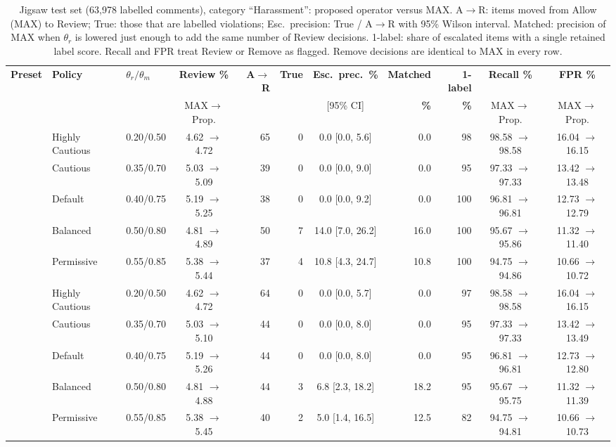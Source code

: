 \begin{table}[!t]
\caption{Jigsaw test set (63,978 labelled comments), category ``Harassment'': proposed operator versus MAX.
A$\to$R: items moved from Allow (MAX) to Review; True: those that are labelled violations;
Esc.\ precision: True / A$\to$R with 95\% Wilson interval. Matched: precision of MAX when $\theta_r$ is lowered
just enough to add the same number of Review decisions. 1-label: share of escalated items with a single retained
label score. Recall and FPR treat Review or Remove as flagged.
Remove decisions are identical to MAX in every row.}
\label{tab:jigsaw-harassment}
\centering\scriptsize
\setlength{\tabcolsep}{3pt}
\begin{tabular}{@{}lllcrrcrrcc@{}}
\toprule
\textbf{Preset} & \textbf{Policy} & $\theta_r/\theta_m$ & \textbf{Review \%} & \textbf{A$\to$R} & \textbf{True} &
\textbf{Esc.\ prec.\ \%} & \textbf{Matched} & \textbf{1-label} & \textbf{Recall \%} & \textbf{FPR \%} \\
 & & & MAX$\to$Prop. & & & [95\% CI] & \textbf{\%} & \textbf{\%} & MAX$\to$Prop. & MAX$\to$Prop. \\
\midrule
{} & Highly Cautious & 0.20/0.50 & 4.62 $\to$ 4.72 & 65 & 0 & 0.0 [0.0, 5.6] & 0.0 & 98 & 98.58 $\to$ 98.58 & 16.04 $\to$ 16.15 \\
 & Cautious & 0.35/0.70 & 5.03 $\to$ 5.09 & 39 & 0 & 0.0 [0.0, 9.0] & 0.0 & 95 & 97.33 $\to$ 97.33 & 13.42 $\to$ 13.48 \\
 & Default & 0.40/0.75 & 5.19 $\to$ 5.25 & 38 & 0 & 0.0 [0.0, 9.2] & 0.0 & 100 & 96.81 $\to$ 96.81 & 12.73 $\to$ 12.79 \\
 & Balanced & 0.50/0.80 & 4.81 $\to$ 4.89 & 50 & 7 & 14.0 [7.0, 26.2] & 16.0 & 100 & 95.67 $\to$ 95.86 & 11.32 $\to$ 11.40 \\
 & Permissive & 0.55/0.85 & 5.38 $\to$ 5.44 & 37 & 4 & 10.8 [4.3, 24.7] & 10.8 & 100 & 94.75 $\to$ 94.86 & 10.66 $\to$ 10.72 \\
\midrule
{} & Highly Cautious & 0.20/0.50 & 4.62 $\to$ 4.72 & 64 & 0 & 0.0 [0.0, 5.7] & 0.0 & 97 & 98.58 $\to$ 98.58 & 16.04 $\to$ 16.15 \\
 & Cautious & 0.35/0.70 & 5.03 $\to$ 5.10 & 44 & 0 & 0.0 [0.0, 8.0] & 0.0 & 95 & 97.33 $\to$ 97.33 & 13.42 $\to$ 13.49 \\
 & Default & 0.40/0.75 & 5.19 $\to$ 5.26 & 44 & 0 & 0.0 [0.0, 8.0] & 0.0 & 95 & 96.81 $\to$ 96.81 & 12.73 $\to$ 12.80 \\
 & Balanced & 0.50/0.80 & 4.81 $\to$ 4.88 & 44 & 3 & 6.8 [2.3, 18.2] & 18.2 & 95 & 95.67 $\to$ 95.75 & 11.32 $\to$ 11.39 \\
 & Permissive & 0.55/0.85 & 5.38 $\to$ 5.45 & 40 & 2 & 5.0 [1.4, 16.5] & 12.5 & 82 & 94.75 $\to$ 94.81 & 10.66 $\to$ 10.73 \\
\bottomrule
\end{tabular}
\end{table}
